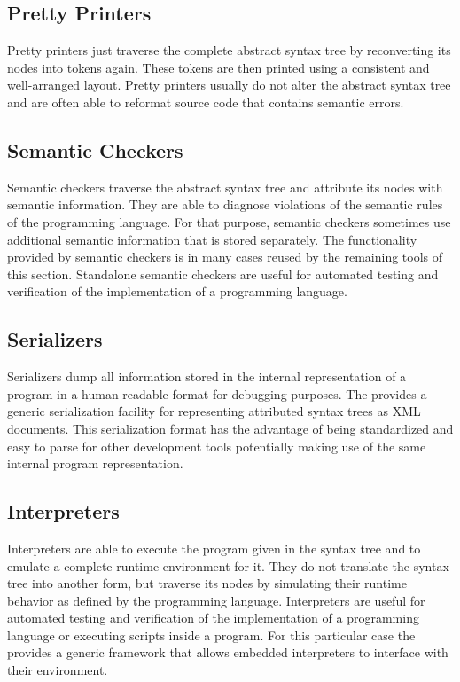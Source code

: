 \subsection{Pretty Printers}

Pretty printers just traverse the complete abstract syntax tree by reconverting its nodes into tokens again.
These tokens are then printed using a consistent and well-arranged layout.
Pretty printers usually do not alter the abstract syntax tree and are often able to reformat source code that contains semantic errors.

\subsection{Semantic Checkers}

Semantic checkers traverse the abstract syntax tree and attribute its nodes with semantic information.
They are able to diagnose violations of the semantic rules of the programming language.
For that purpose, semantic checkers sometimes use additional semantic information that is stored separately.
The functionality provided by semantic checkers is in many cases reused by the remaining tools of this section.
Standalone semantic checkers are useful for automated testing and verification of the implementation of a programming language.

\subsection{Serializers}

Serializers dump all information stored in the internal representation of a program in a human readable format for debugging purposes.
The \ecs{} provides a generic serialization facility for representing attributed syntax trees as XML documents.
This serialization format has the advantage of being standardized and easy to parse for other development tools potentially making use of the same internal program representation.

\subsection{Interpreters}

Interpreters are able to execute the program given in the syntax tree and to emulate a complete runtime environment for it.
They do not translate the syntax tree into another form, but traverse its nodes by simulating their runtime behavior as defined by the programming language.
Interpreters are useful for automated testing and verification of the implementation of a programming language or executing scripts inside a program.
For this particular case the \ecs{} provides a generic framework that allows embedded interpreters to interface with their environment.

